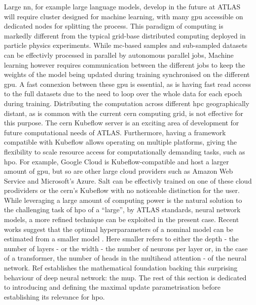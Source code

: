 Large \gls{nn}, for example large language models, develop in the future at ATLAS will require cluster designed for machine learning, with many \gls{gpu} accessible on dedicated nodes for splitting the process. This paradigm of computing is markedly different from the typical grid-base distributed computing deployed in particle physics experiments. While \gls{mc}-based samples and sub-sampled datasets can be effectivly processed in parallel by autonomous parallel jobs, Machine learning however requires communication between the different jobs to keep the weights of the model being updated during training synchronised on the different \gls{gpu}. A fast connexion between these \gls{gpu} is essential, as is having fast read access to the full datasets due to the need to loop over the whole data for each epoch during training. Distributing the computation across different \gls{hpc} geographically distant, as is common with the current \gls{cern} computing grid, is not effective for this purpose. The \gls{cern} Kubeflow server is an exciting area of development for future computational needs of ATLAS. Furthermore, having a framework compatible with Kubeflow allows operating on multiple platforms, giving the flexibility to scale resource access for computationally demanding tasks, such as \gls{hpo}. For example, Google Cloud is Kubeflow-compatible and host a larger amount of \gls{gpu}, but so are other large cloud providers such as Amazon Web Service and Microsoft's Azure. Salt can be effectivly trained on one of these cloud prodividers or the \gls{cern}'s Kubeflow with no noticeable distinction for the user. \\

While leveraging a large amount of computing power is the natural solution to the challenging task of \gls{hpo} of a ``large'', by ATLAS standards, neural network models, a more refined technique can be exploited in the present case. Recent works suggest that the optimal hyperparameters of a nominal model can be estimated from a smaller model \cite{yang2021tuning}. Here smaller refers to either the depth - the number of layers - or the width - the number of neurons per layer or, in the case of a transformer, the number of heads in the multihead attention - of the neural network. Ref \cite{pmlr-v139-yang21c} establishes the mathematical foundation backing this surprising behaviour of deep neural network: the \gls{mup}. The rest of this section is dedicated to introducing and defining the maximal update parametrisation before establishing its relevance for \gls{hpo}. \\

